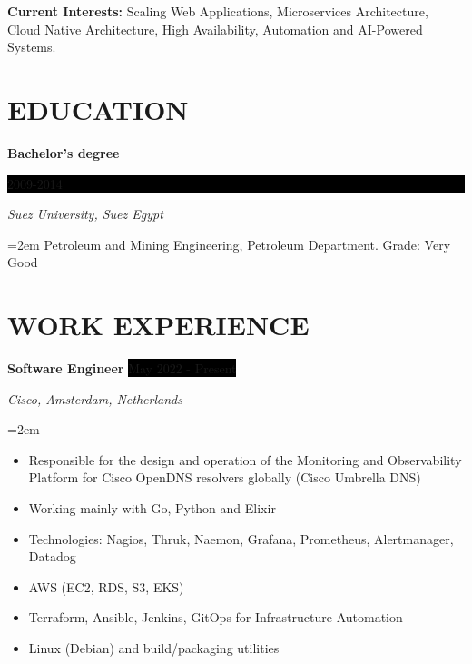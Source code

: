 \documentclass[paper=a4,fontsize=11pt]{scrartcl} %
\newcommand{\sepspace}{\vspace*{1em}}		%
\newcommand{\NewPart}[1]{\section*{\uppercase{#1}}}
\newcommand{\EducationEntry}[4]{
		\noindent \textbf{#1} \hfill      %
		\colorbox{Black}{%
			\parbox{6em}{%
			\hfill\color{White}#2}} \par  %
		\noindent \textit{#3} \par        %
		\noindent\hangindent=2em\hangafter=0 \small #4 %
		\normalsize \par}
\newcommand{\WorkEntry}[4]{				  %
		\noindent \textbf{#1} \hfill      %
		\colorbox{Black}{\color{White}#2} \par  %
		\noindent \textit{#3} \par              %
		\noindent\hangindent=2em\hangafter=0 \small #4 %
		\normalsize \par}
\begin{document}
\sepspace

\textbf{Current Interests:} Scaling Web Applications, Microservices Architecture, Cloud Native Architecture, High Availability, Automation and AI-Powered Systems.

\sepspace


\NewPart{Education}{}

\EducationEntry{Bachelor's degree}{2009-2014}{Suez University, Suez Egypt}{Petroleum and Mining Engineering, Petroleum Department. Grade: Very Good}


\NewPart{Work experience}{}

\WorkEntry{Software Engineer}{May 2022 - Present}{Cisco, Amsterdam, Netherlands}{\begin{itemize}
\item Responsible for the design and operation of the Monitoring and Observability Platform for Cisco OpenDNS resolvers globally (Cisco Umbrella DNS)
\item Working mainly with Go, Python and Elixir
\item Technologies: Nagios, Thruk, Naemon, Grafana, Prometheus, Alertmanager, Datadog
\item AWS (EC2, RDS, S3, EKS)
\item Terraform, Ansible, Jenkins, GitOps for Infrastructure Automation
\item Linux (Debian) and build/packaging utilities
\end{itemize}}
\sepspace
\end{document}
